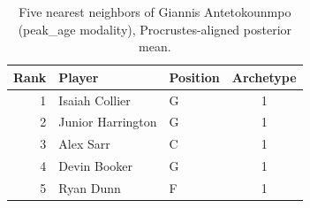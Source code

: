 \begin{table}[htbp]
  \centering\small
  \begin{tabular}{rllc}
    \toprule
    Rank & Player & Position & Archetype \\
    \midrule
    1 & Isaiah Collier & G & 1 \\
    2 & Junior Harrington & G & 1 \\
    3 & Alex Sarr & C & 1 \\
    4 & Devin Booker & G & 1 \\
    5 & Ryan Dunn & F & 1 \\
    \bottomrule
  \end{tabular}
  \caption{Five nearest neighbors of Giannis Antetokounmpo (peak_age modality), Procrustes-aligned posterior mean.}
  \label{tab:Giannis_Antetokounmpo_neighbors_peak_age}
\end{table}

